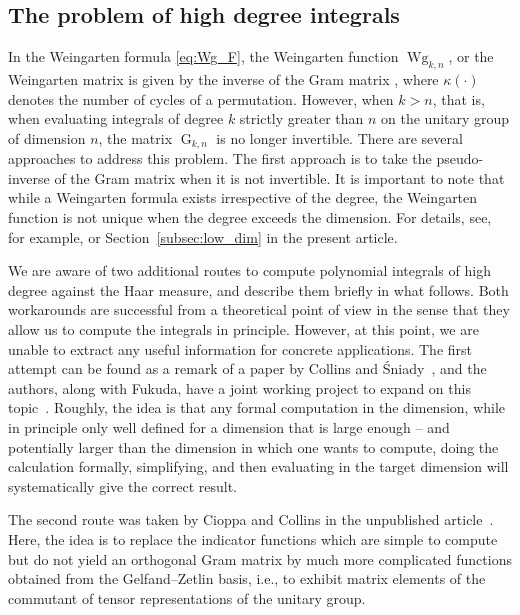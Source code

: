 \documentclass[pdftex]{sigma}
\numberwithin{equation}{section}
\theoremstyle{definition}
\DeclareMathOperator{\G}{G}
\DeclareMathOperator{\Wg}{Wg}
\begin{document}
\subsection{The problem of high degree integrals}\label{sec:problem}

In the Weingarten formula \eqref{eq:Wg_F}, the Weingarten function $\Wg_{k,n}$, or
the Weingarten matrix \smash{$\bigl(\Wg_{k,n}\bigl(\sigma \tau^{-1}\bigr)\bigr)_{\sigma,\tau \in S_k}$}
is given by the inverse of the Gram matrix \smash{$\G_{k,n}=\bigl(n^{\kappa(\sigma\tau^{-1})}\bigr)_{\sigma,\tau \in S_k}$}, where $\kappa(\cdot)$ denotes the number of cycles of a permutation.
However, when $k>n$, that is, when evaluating integrals of degree $k$ strictly greater than $n$ on the unitary group of dimension $n$, the matrix $\G_{k,n}$ is no longer invertible. There are several approaches to address this problem. The first approach is to take the pseudo-inverse of the Gram matrix when it is not invertible. It is important to note that while a Weingarten formula exists irrespective of the degree, the Weingarten function is not unique when the degree exceeds the dimension. For details, see, for example, \cite{CMN} or
Section~\ref{subsec:low_dim} in the present article.

We are aware of two additional routes to compute polynomial integrals of high degree against the Haar measure, and describe them briefly in what follows. Both workarounds are successful from a theoretical point of view in the sense that they allow us to compute the integrals in principle. However, at this point, we are unable to extract any useful information for concrete applications.
The first attempt can be found as a remark of a paper by Collins and \'Sniady~\cite{CollinsSniady2006}, and the authors, along with Fukuda, have a joint working project to expand on this topic~\cite{CollinsFukudaMatsumoto}.
Roughly, the idea is that any formal computation in the dimension, while in principle only well defined for a dimension that is large enough -- and potentially larger than the dimension in which one wants to compute, doing the calculation formally, simplifying, and then evaluating in the target dimension will systematically give the correct result.


The second route was taken by Cioppa and Collins in the
unpublished article~\cite{CioppaCollins}.
Here, the idea is to replace the indicator functions which are simple to compute but do not yield an orthogonal Gram matrix by much more complicated functions obtained from the Gelfand--Zetlin basis, i.e., to exhibit matrix elements of the commutant of tensor representations of the unitary group.
\end{document}
